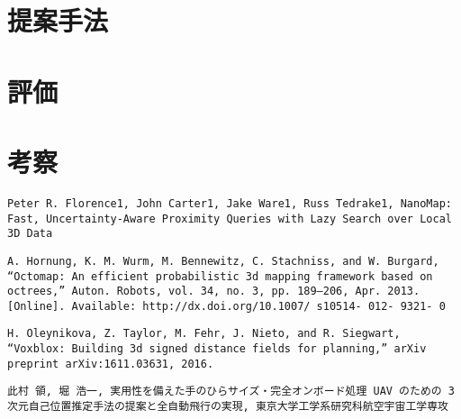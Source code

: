 \documentclass[a4j,10pt]{jsarticle}
\begin{document}
\section{提案手法}

\section{評価}

\section{考察}

\begin{thebibliography}{99}
\texttt{Peter R. Florence1, John Carter1, Jake Ware1, Russ Tedrake1, NanoMap: Fast, Uncertainty-Aware Proximity Queries with Lazy Search over Local 3D Data}

\texttt{A. Hornung, K. M. Wurm, M. Bennewitz, C. Stachniss, and W. Burgard, “Octomap: An efficient probabilistic 3d mapping framework based on octrees,” Auton. Robots, vol. 34, no. 3, pp. 189–206, Apr. 2013. [Online]. Available: http://dx.doi.org/10.1007/ s10514- 012- 9321- 0}

\texttt{H. Oleynikova, Z. Taylor, M. Fehr, J. Nieto, and R. Siegwart, “Voxblox: Building 3d signed distance fields for planning,” arXiv preprint arXiv:1611.03631, 2016.}

\texttt{此村 領, 堀 浩一, 実用性を備えた手のひらサイズ・完全オンボード処理 UAV のための 3 次元自己位置推定手法の提案と全自動飛行の実現, 東京大学工学系研究科航空宇宙工学専攻}

\end{thebibliography}
\end{document}
